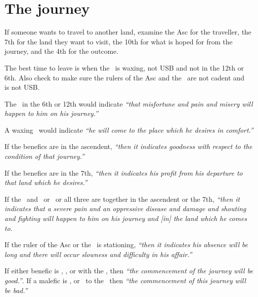 \section{The journey}
If someone wants to travel to another land, examine the Asc for the traveller, the 7th for the land they want to visit, the 10th for what is hoped for from the journey, and the 4th for the outcome.

The best time to leave is when the \Moon\, is waxing, not USB and not in the 12th or 6th. Also check to make sure the rulers of the Asc and the \Moon\, are not cadent and \Mercury\, is not USB.

The \Moon\, in the 6th or 12th would indicate \textsl{``that misfortune and pain and misery will happen to him on his journey.''}

A waxing \Moon\, would indicate \textsl{``he will come to the place which he desires in comfort.''}

If the benefics are in the ascendent, \textsl{``then it indicates goodness with respect to the condition of that journey.''}

If the benefics are in the 7th, \textsl{``then it indicates his profit from his departure to that land which he desires.''}

If the \Moon\, and \Saturn\, or \Mars\, or all three are together in the ascendent or the 7th, \textsl{``then it indicates that a severe pain and an oppressive disease and damage and shouting and fighting will happen to him on his journey and [in] the land which he comes to.}

If the ruler of the Asc or the \Moon\, is stationing, \textsl{``then it indicates his absence will be long and there will occur slowness and difficulty in his affair.''}

If either benefic is \Square, \Opposition, or with the \Moon, then \textsl{``the commencement of the journey will be good.''}. If a malefic is \Square, or \Opposition\, to the \Moon\, then \textsl{``the commencement of this journey will be bad.''}

